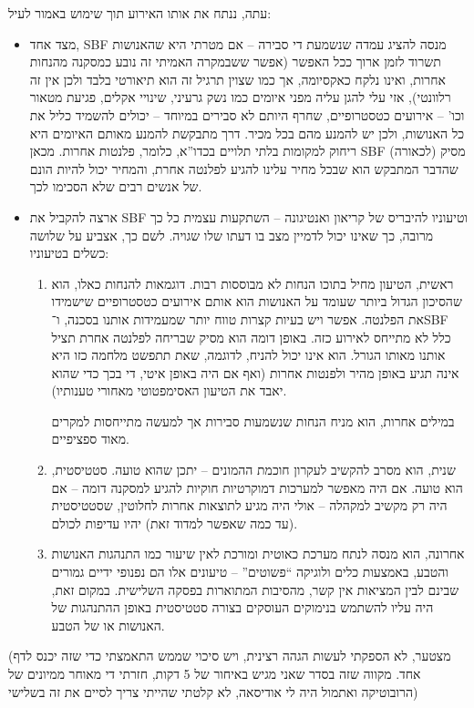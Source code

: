 \documentclass[]{article}
\begin{document}
    עתה, ננתח את אותו האירוע תוך שימוש באמור לעיל: 
    \begin{itemize}
        \item מצד אחד, SBF מנסה להציג עמדה שנשמעת די סבירה – אם מטרתי היא שהאנושות תשרוד לזמן ארוך ככל האפשר (אפשר ששבמקרה האמיתי זה נובע כמסקנה מהנחות אחרות, ואינו נלקח כאקסיומה, אך כמו שצוין תרגיל זה הוא תיאורטי בלבד ולכן אין זה רלוונטי), אזי עלי להגן עליה מפני איומים כמו נשק גרעיני, שינויי אקלים, פגיעת מטאור וכו' – אירועים כטסטרופיים, שחרף היותם לא סבירים במיוחד – יכולים להשמיד כליל את כל האנושות, ולכן יש להמנע מהם בכל מכיר. דרך מתבקשת להמנע מאותם האיומים היא ריחוק למקומות בלתי תלויים בכדו''א, כלומר, פלנטות אחרות. מכאן SBF מסיק (לכאורה) שהדבר המתבקש הוא שבכל מחיר עלינו להגיע לפלנטה אחרת, והמחיר יכול להיות הונם של אנשים רבים שלא הסכימו לכך. 
        \item ארצה להקביל את SBF וטיעוניו להיבריס של קריאון ואנטיגונה – השתקעות עצמית כל כך מרובה, כך שאינו יכול לדמיין מצב בו דעתו שלו שגויה. לשם כך, אצביע על שלושה כשלים בטיעוניו: 
        \begin{enumerate}
            \item ראשית, הטיעון מחיל בתוכו הנחות לא מבוססות רבות. דוגמאות להנחות כאלו, הוא שהסיכון הגדול ביותר שעומד על האנושות הוא אותם אירועים כטסטרופיים שישמידו את הפלנטה. אפשר ויש בעיות קצרות טווח יותר שמעמידות אותנו בסכנה, ו־SBF כלל לא מתייחס לאירוע כזה. באופן דומה הוא מסיק שבריחה לפלנטה אחרת תציל אותנו מאותו הגורל. הוא אינו יכול להניח, לדוגמה, שאת תתפשט מלחמה כזו היא אינה תגיע באופן מהיר ולפנטות אחרות (ואף אם היה באופן איטי, די בכך כדי שהוא יאבד את הטיעון האסימפטוטי מאחורי טענותיו). 
            
            במילים אחרות, הוא מניח הנחות שנשמעות סבירות אך למעשה מתייחסות למקרים מאוד ספציפיים. 
            \item שנית, הוא מסרב להקשיב לעקרון חוכמת ההמונים – יתכן שהוא טועה. סטטיסטית, הוא טועה. אם היה מאפשר למערכות דמוקרטיות חוקיות להגיע למסקנה דומה – אם היה רק מקשיב למקהלה – אולי היה מגיע לתוצאות אחרות לחלוטין, שסטטיסטית (עד כמה שאפשר למדוד זאת) יהיו עדיפות לכולם. 
            
            \item אחרונה, הוא מנסה לנתח מערכת כאוטית ומורכת לאין שיעור כמו התנהגות האנושות והטבע, באמצעות כלים ולוגיקה ``פשוטים'' – טיעונים אלו הם נפנופי ידיים גמורים שבינם לבין המציאות אין קשר, מהסיבות המתוארות בפסקה השלישית. במקום זאת, היה עליו להשתמש בנימוקים העוסקים בצורה סטטיסטית באופן ההתנהגות של האנושות או של הטבע. 
        \end{enumerate}
    \end{itemize}
    
    (מצטער, לא הספקתי לעשות הגהה רצינית, ויש סיכוי שממש התאמצתי כדי שזה יכנס לדף אחד. מקווה שזה בסדר שאני מגיש באיחור של 5 דקות, חזרתי די מאוחר ממיונים של הרובוטיקה ואתמול היה לי אודיסאה, לא קלטתי שהייתי צריך לסיים את זה בשלישי)
    
\end{document}

